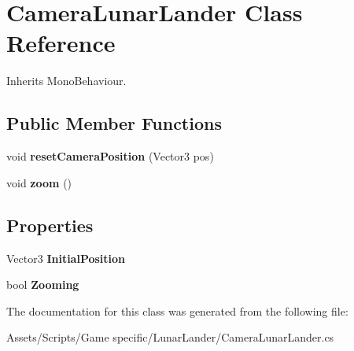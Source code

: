 \hypertarget{class_camera_lunar_lander}{\section{Camera\-Lunar\-Lander Class Reference}
\label{class_camera_lunar_lander}
}


Inherits Mono\-Behaviour.

\subsection*{Public Member Functions}
\begin{DoxyCompactItemize}
\item 
\hypertarget{class_camera_lunar_lander_a9bad896cececb21a3f14260b9957555f}{void {\bfseries reset\-Camera\-Position} (Vector3 pos)}\label{class_camera_lunar_lander_a9bad896cececb21a3f14260b9957555f}

\item 
\hypertarget{class_camera_lunar_lander_a5784c5ea9a2a22d7a4c98db80fde874f}{void {\bfseries zoom} ()}\label{class_camera_lunar_lander_a5784c5ea9a2a22d7a4c98db80fde874f}

\end{DoxyCompactItemize}
\subsection*{Properties}
\begin{DoxyCompactItemize}
\item 
\hypertarget{class_camera_lunar_lander_af3138b4d606f164655a1ab8b2405f776}{Vector3 {\bfseries Initial\-Position}}\label{class_camera_lunar_lander_af3138b4d606f164655a1ab8b2405f776}

\item 
\hypertarget{class_camera_lunar_lander_a86cba57eb64aa51ccf0800f871d2416a}{bool {\bfseries Zooming}}\label{class_camera_lunar_lander_a86cba57eb64aa51ccf0800f871d2416a}

\end{DoxyCompactItemize}


The documentation for this class was generated from the following file\-:\begin{DoxyCompactItemize}
\item 
Assets/\-Scripts/\-Game specific/\-Lunar\-Lander/Camera\-Lunar\-Lander.\-cs\end{DoxyCompactItemize}
